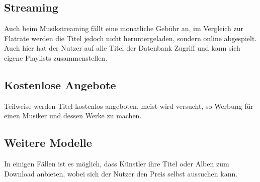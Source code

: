 \documentclass{article}
\begin{document}
	\subsection*{Streaming}
	Auch beim Musikstreaming fällt eine monatliche Gebühr an, im Vergleich zur Flatrate werden die Titel jedoch nicht heruntergeladen, sondern online abgespielt. Auch hier hat der Nutzer auf alle Titel der Datenbank Zugriff und kann sich eigene Playlists zusammenstellen. \cite{modelleWiki}
	
	\subsection*{Kostenlose Angebote}
	Teilweise werden Titel kostenlos angeboten, meist wird versucht, so Werbung für einen Musiker und dessen Werke zu machen. \cite{modelleWiki}
	
	\subsection*{Weitere Modelle}
	In einigen Fällen ist es möglich, dass Künstler ihre Titel oder Alben zum Download anbieten, wobei sich der Nutzer den Preis selbst aussuchen kann. \cite{modelleWiki}
	
	
	
	\newpage
	
	
\end{document}
